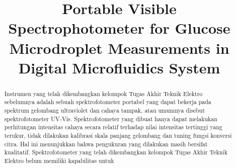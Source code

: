\documentclass[conference]{IEEEtran}
\begin{document}
\title{Portable Visible Spectrophotometer for Glucose Microdroplet Measurements in Digital Microfluidics System}

\author{
\and
{}
\and
{}
\and
{}
\and
{}
}

\maketitle

\begin{abstract}
    Instrumen yang telah dikembangkan kelompok Tugas Akhir Teknik Elektro sebelumnya adalah sebuah spektrofotometer portabel yang dapat bekerja pada spektrum gelombang ultraviolet dan cahaya tampak, atau umumnya disebut spektrofotometer UV-Vis. Spektrofotometer yang dibuat hanya dapat melakukan perhitungan intensitas cahaya secara relatif terhadap nilai intensitas tertinggi yang terukur, tidak dilakukan kalibrasi skala panjang gelombang dan tuning fungsi konversi citra. Hal ini menunjukkan bahwa pengukuran yang dilakukan masih bersifat kualitatif. Spektrofotometer yang telah dikembangkan kelompok Tugas Akhir Teknik Elektro belum memiliki kapabilitas untuk 
\end{abstract}
\end{document}
